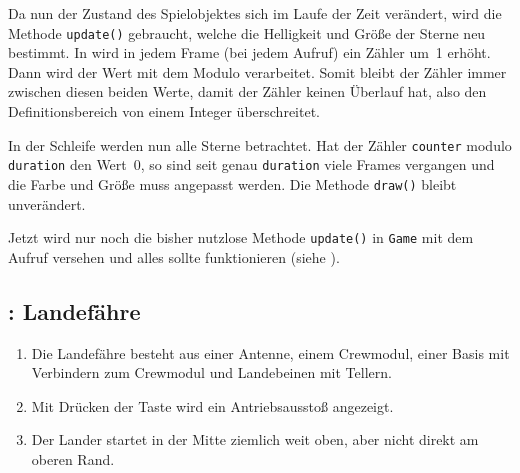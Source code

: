 
\begin{figure}%
	\begin{center}%
		\vspace{-0.5cm}%
	\end{center}%
\end{figure}%
Da nun der Zustand des Spielobjektes sich im Laufe der Zeit verändert, wird die Methode \texttt{update()} gebraucht, welche die Helligkeit und Größe der Sterne neu bestimmt. In  wird in jedem Frame (bei jedem Aufruf) ein Zähler um~1 erhöht. Dann wird der Wert mit dem Modulo verarbeitet. Somit bleibt der Zähler immer zwischen diesen beiden Werte, damit der Zähler keinen Überlauf hat, also den Definitionsbereich von einem Integer überschreitet.

In der Schleife werden nun alle Sterne betrachtet. Hat der Zähler \texttt{counter} modulo \texttt{duration} den Wert~0, so sind seit genau \texttt{duration} viele Frames vergangen und die Farbe und Größe muss angepasst werden. Die Methode \texttt{draw()} bleibt unverändert. 


Jetzt wird nur noch die bisher nutzlose Methode \texttt{update()} in \texttt{Game} mit dem Aufruf versehen und alles sollte funktionieren (siehe ).


\subsection{: Landefähre}

\begin{enumerate}
	\item Die Landefähre besteht aus einer Antenne, einem Crewmodul, einer Basis mit Verbindern zum Crewmodul und Landebeinen mit Tellern.\label{reqLanderAufbau}
	\item Mit Drücken der Taste \keys{\SPACE} wird ein Antriebsausstoß angezeigt. \label{reqLanderAusstoß}
	\item Der Lander startet in der Mitte ziemlich weit oben, aber nicht direkt am oberen Rand.\label{reqLanderStart}
\end{enumerate}
\er

